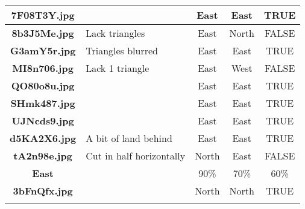 \documentclass{article}
\begin{document}
\begin{table}[h!]
{\begin{tabular}{|c|p{4cm}|c|c|c|}
            \rowcolor{gray!10}
            \textbf{7F08T3Y.jpg} &                              & East                          & East                             & TRUE                 \\ \hline
            \rowcolor{gray!0}
            \textbf{8b3J5Me.jpg} & Lack triangles               & East                          & North                            & FALSE                \\ \hline
            \rowcolor{gray!10}
            \textbf{G3amY5r.jpg} & Triangles blurred            & East                          & East                             & TRUE                 \\ \hline
            \rowcolor{gray!0}
            \textbf{MI8n706.jpg} & Lack 1 triangle              & East                          & West                             & FALSE                \\ \hline
            \rowcolor{gray!10}
            \textbf{QO80o8u.jpg} &                              & East                          & East                             & TRUE                 \\ \hline
            \rowcolor{gray!0}
            \textbf{SHmk487.jpg} &                              & East                          & East                             & TRUE                 \\ \hline
            \rowcolor{gray!10}
            \textbf{UJNcds9.jpg} &                              & East                          & East                             & TRUE                 \\ \hline
            \rowcolor{gray!0}
            \textbf{d5KA2X6.jpg} & A bit of land behind         & East                          & East                             & TRUE                 \\ \hline
            \rowcolor{gray!10}
            \textbf{tA2n98e.jpg} & Cut in half horizontally     & North                         & East                             & FALSE                \\ \hline
            \rowcolor{gray!40}
            \textbf{East}        &                              & 90\%                          & 70\%                             & 60\%                 \\ \hline
            \rowcolor{gray!0}
            \textbf{3bFnQfx.jpg} &                              & North                         & North                            & TRUE                 \\ \hline
            \rowcolor{gray!10}

\end{tabular}}
\end{table}
\end{document}
